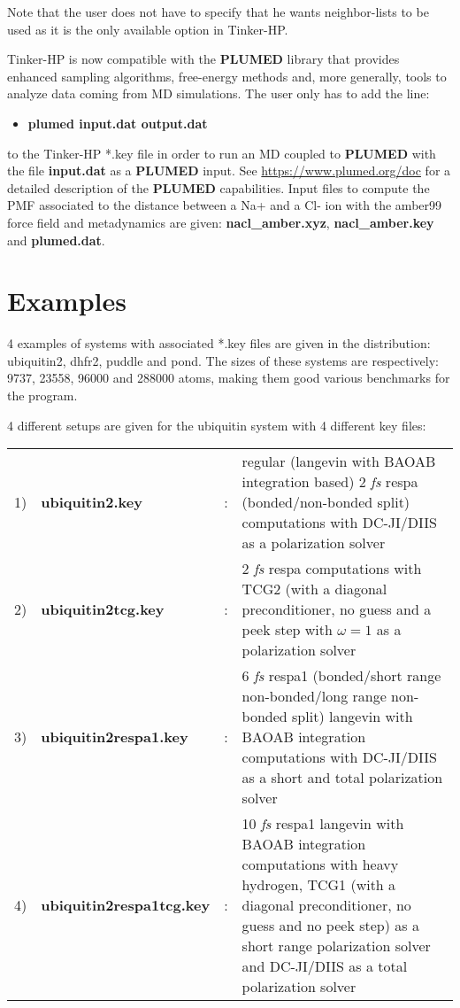 \documentclass[peerreview]{IEEEtran}
\begin{document}
\vskip5mm
Note that the user does not have to specify that he wants neighbor-lists to be used as it is the only available option in Tinker-HP.

\vskip5mm
Tinker-HP is now compatible with the \textbf{PLUMED} library that provides enhanced sampling algorithms, free-energy methods and, more generally, tools to analyze data coming from MD simulations. The user only has to add the line: 
\begin{itemize}
\item[]\textbf{plumed input.dat output.dat}
\end{itemize}
to the Tinker-HP *.key file in order to run an MD coupled to \textbf{PLUMED} with the file \textbf{input.dat} as a \textbf{PLUMED} input. See \url{https://www.plumed.org/doc} for a detailed description of the \textbf{PLUMED} capabilities. Input files to compute the PMF associated to the distance between a Na+ and a Cl- ion with the amber99 force field and metadynamics are given: \textbf{nacl\_amber.xyz}, \textbf{nacl\_amber.key} and \textbf{plumed.dat}.
\section{Examples}
4 examples of systems with associated *.key files are given in the distribution: ubiquitin2, dhfr2, puddle and pond. The sizes of these systems are respectively: 9737, 23558, 96000 and 288000 atoms, making them good various benchmarks for the program. 

4 different setups are given for the ubiquitin system with 4 different key files:

\begin{tabular}{lllp{13.3cm}}
1)&\textbf{ubiquitin2.key}& : &regular (langevin with BAOAB integration based) 2 {\em fs} respa (bonded/non-bonded split) computations with DC-JI/DIIS as a polarization solver \\
2)&\textbf{ubiquitin2tcg.key}& : &2 {\em fs} respa computations with TCG2 (with a diagonal preconditioner, no guess and a peek step with $\omega=1$ as a polarization solver\\
3)&\textbf{ubiquitin2respa1.key}& : &6 {\em fs} respa1 (bonded/short range non-bonded/long range non-bonded split) langevin with BAOAB integration computations with DC-JI/DIIS as a short and total polarization solver\\
4)&\textbf{ubiquitin2respa1tcg.key}& : &10 {\em fs} respa1 langevin with BAOAB integration computations with heavy hydrogen, TCG1 (with a diagonal preconditioner, no guess and no peek step) as a short range polarization solver and DC-JI/DIIS as a total polarization solver\\
\end{tabular}
\end{document}
